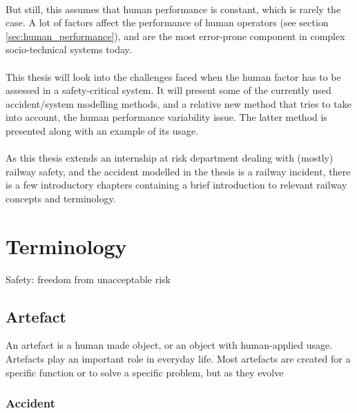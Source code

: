 \\
But still, this assumes that human performance is constant, which is rarely the case. A lot of factors affect the performance of human operators (see section \ref{sec:human_performance}), and are the most error-prone component in complex socio-technical systems today.\\
\\
This thesis will look into the challenges faced when the human factor has to be assessed in a safety-critical system. It will present some of the currently used accident/system modelling methods, and a relative new method that tries to take into account, the human performance variability issue. The latter method is presented along with an example of its usage.\\
\\
As this thesis extends an internship at risk department dealing with (mostly) railway safety, and the accident modelled in the thesis is a railway incident, there is a few introductory chapters containing a brief introduction to relevant railway concepts and terminology.

\section{Terminology}
Safety: freedom from unacceptable risk


\subsection{Artefact}
An artefact is a human made object, or an object with human-applied usage. Artefacts play an important role in everyday life. Most artefacts are created for a specific function or to solve a specific problem, but as they evolve 
\subsubsection{Accident}

